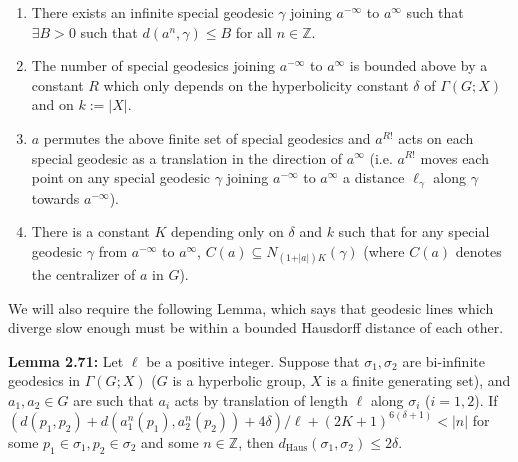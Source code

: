 \documentclass[12pt]{article}
\newcommand{\vs}{\vskip10pt}
\begin{document}
	\begin{enumerate}[label = (\roman*)]
		\item There exists an infinite special geodesic $\gamma$ joining $a^{-\infty}$ to $a^{\infty}$ such that $\exists B > 0$ such that $d(a^n, \gamma) \leq B$ for all $n \in \mathbb{Z}$. 
		\item The number of special geodesics joining $a^{-\infty}$ to $a^{\infty}$ is bounded above by a constant $R$ which only depends on the hyperbolicity constant $\delta$ of $\Gamma(G; X)$ and on $k := \vert X \vert$. 
		\item $a$ permutes the above finite set of special geodesics and $a^{R!}$ acts on each special geodesic as a translation in the direction of $a^{\infty}$ (i.e. $a^{R!}$ moves each point on any special geodesic $\gamma$ joining $a^{-\infty}$ to $a^{\infty}$ a distance $\ell_{\gamma}$ along $\gamma$ towards $a^{- \infty}$). 
		\item There is a constant $K$ depending only on $\delta$ and $k$ such that for any special geodesic $\gamma$ from $a^{-\infty}$ to $a^{\infty}$, $C(a) \subseteq N_{(1 + \vert a \vert)K}(\gamma)$ (where $C(a)$ denotes the centralizer of $a$ in $G$). 
	\end{enumerate}

	We will also require the following Lemma, which says that geodesic lines which diverge slow enough must be within a bounded Hausdorff distance of each other.
	
	\vs 
	
	\textbf{Lemma 2.71: } Let $\ell$ be a positive integer. Suppose that $\sigma_1, \sigma_2$ are bi-infinite geodesics in $\Gamma(G; X)$ ($G$ is a hyperbolic group, $X$ is a finite generating set), and $a_1, a_2 \in G$ are such that $a_i$ acts by translation of length $\ell$ along $\sigma_i$ ($i=1,2$). If $(d(p_1, p_2) + d(a_1^n(p_1), a_2^n(p_2)) + 4 \delta)/\ell + (2K+1)^{6 (\delta + 1)} < \vert n \vert$ for some $p_1 \in \sigma_1, p_2 \in \sigma_2$ and some $n \in \mathbb{Z}$, then $d_{\text{Haus}}(\sigma_1, \sigma_2) \leq 2 \delta$.  
	
\end{document}
